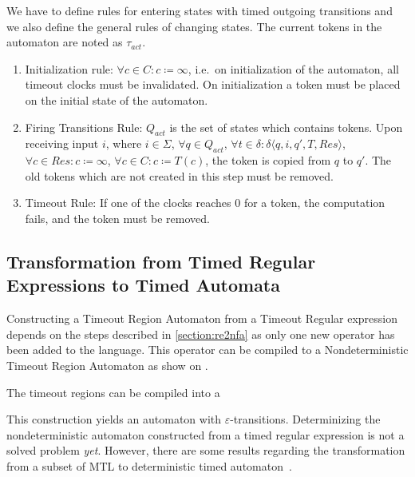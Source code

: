 				We have to define rules for entering states with timed outgoing transitions and we also define the general rules of changing states. 
				The current tokens in the automaton are noted as $\tau_{act}$.
				
				\begin{enumerate}
					\item Initialization rule: 
						$\forall c \in C \colon c \coloneqq \infty$, i.e.~on initialization of the automaton, all timeout clocks must be invalidated.
						On initialization a token must be placed on the initial state of the automaton.
					\item Firing Transitions Rule:
						$Q_{act}$ is the set of states which contains tokens.
						Upon receiving input $i$, where $i \in \Sigma$, $\forall q \in Q_{act}$, $\forall t \in \delta \colon \delta \langle q, i, q', T, \mathit{Res} \rangle$,
						$\forall c \in \mathit{Res} \colon c \coloneqq \infty$,
						$\forall c \in C \colon c \coloneqq T(c)$,
						the token is copied from $q$ to $q'$.
						The old tokens which are not created in this step must be removed.
					\item Timeout Rule:
						If one of the clocks reaches 0 for a token, the computation fails, and the token must be removed.
				\end{enumerate}
	
		\subsection{Transformation from Timed Regular Expressions to Timed Automata}
			\label{section:tre2tnfa}	
			Constructing a Timeout Region Automaton from a Timeout Regular expression depends on the steps described in \cref{section:re2nfa} as only one new operator has been added to the language.
			This operator can be compiled to a Nondeterministic Timeout Region Automaton as show on %
			.
			
			The timeout regions can be compiled into a 
		
			This construction yields an automaton with $\varepsilon$-transitions. Determinizing the nondeterministic automaton constructed from a timed regular expression is not a solved problem \emph{yet}. However, there are some results regarding the transformation from a subset of MTL to deterministic timed automaton~\citep{nivckovic2010mtl}.
			
